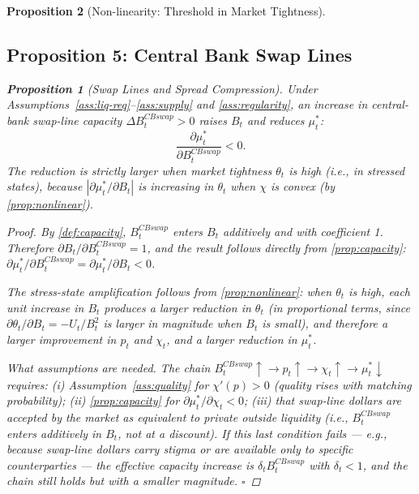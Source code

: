 \documentclass[12pt]{article}
\newtheorem{proposition}{Proposition}
\theoremstyle{definition}
\newcommand{\1}[1]{\mathds{1}\left[#1\right]}
\begin{document}
\begin{proposition}[Non-linearity: Threshold in Market Tightness]
\subsection{Proposition 5: Central Bank Swap Lines}

\begin{proposition}[Swap Lines and Spread Compression]
  \label{prop:swaplines}
  Under Assumptions~\ref{ass:liq-req}--\ref{ass:supply} and
  \ref{ass:regularity}, an increase in central-bank swap-line capacity
  $\Delta B_t^{CBswap} > 0$ raises $B_t$ and reduces $\mu_t^*$:
  \[
    \frac{\partial \mu_t^*}{\partial B_t^{CBswap}} < 0.
  \]
  The reduction is strictly larger when market tightness $\theta_t$ is high
  (i.e., in stressed states), because $|\partial\mu_t^*/\partial B_t|$ is
  increasing in $\theta_t$ when $\chi$ is convex (by \cref{prop:nonlinear}).
\end{proposition}

\begin{proof}
  By \cref{def:capacity}, $B_t^{CBswap}$ enters $B_t$ additively and with
  coefficient 1. Therefore $\partial B_t/\partial B_t^{CBswap} = 1$, and the
  result follows directly from \cref{prop:capacity}:
  $\partial\mu_t^*/\partial B_t^{CBswap} = \partial\mu_t^*/\partial B_t < 0$.

  The stress-state amplification follows from \cref{prop:nonlinear}: when
  $\theta_t$ is high, each unit increase in $B_t$ produces a larger reduction
  in $\theta_t$ (in proportional terms, since $\partial\theta_t/\partial B_t
  = -U_t/B_t^2$ is larger in magnitude when $B_t$ is small), and therefore
  a larger improvement in $p_t$ and $\chi_t$, and a larger reduction in
  $\mu_t^*$.

  \textit{What assumptions are needed.} The chain $B_t^{CBswap} \uparrow \to
  p_t \uparrow \to \chi_t \uparrow \to \mu_t^* \downarrow$ requires:
  (i) Assumption~\ref{ass:quality} for $\chi'(p) > 0$ (quality rises with
  matching probability); (ii) \cref{prop:capacity} for $\partial\mu_t^*/
  \partial\chi_t < 0$; (iii) that swap-line dollars are accepted by the market
  as equivalent to private outside liquidity (i.e., $B_t^{CBswap}$ enters
  additively in $B_t$, not at a discount). If this last condition fails ---
  e.g., because swap-line dollars carry stigma or are available only to
  specific counterparties --- the effective capacity increase is $\delta_t
  B_t^{CBswap}$ with $\delta_t < 1$, and the chain still holds but with a
  smaller magnitude.
  \hfill$\square$
\end{proof}


\end{proposition}
\end{document}

